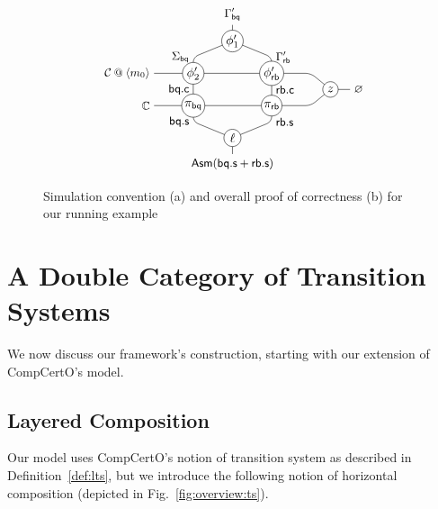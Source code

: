 \documentclass[acmsmall,screen,review,anonymous]{acmart}
\newcommand{\kw}[1]{\ensuremath{ \mathsf{#1} }}
\begin{document}
\begin{figure}
\[{{\begin{tikzpicture}[yscale=0.45,xscale=1.1]
    \begin{scope}
      \small
      \draw (0,5) node[above] {$\Gamma_\kw{bq}'$} -- (0,4)
        [rounded corners] -- (-1,3) node[left] {$\Sigma_\kw{bq}$}
        [rounded corners] -- (-1,-1) node[left,pos=0.5] {$\kw{bq.c}$}
          node[left,pos=1] {$\kw{bq.s}$}
        [sharp corners] -- (0,-2)
          -- (0,-3) node[below] {$\kw{Asm}(\kw{bq.s+rb.s})$};
      \draw (0,4)
        [rounded corners] -- (1,3) node[right] {$\Gamma_\kw{rb}'$}
        [rounded corners] -- (1,-1) node[right,pos=0.5] {$\kw{rb.c}$}
          node[right,pos=1] {$\kw{rb.s}$}
        [sharp corners] -- (0,-2);
      \draw (-2,2) node[left] {$\mathcal{C} \mathbin@ \langle m_0 \rangle$}
        [rounded corners] -- (2,2)
        [sharp corners] -- (2.5,1) -- (3,1) node[right] {$\varnothing$};
      \draw (2.5,1)
        [rounded corners] -- (2,0)
        [sharp corners] -- (-2,0) node[left] {$\mathbb{C}$};
    \end{scope}

    \begin{scope}[every node/.style={circle,draw,fill=white,inner sep=1pt}]
      \node at (0,4) {$\phi_1'$};
      \node at (-1,2) {$\phi_2'$};
      \node at (+1,2) {$\phi_\kw{rb}'$};
      \node at (-1,0) {$\pi_\kw{bq}$};
      \node at (+1,0) {$\pi_\kw{rb}$};
      \node[inner sep=2pt] at (0,-2) {$\ell$};
      \node[inner sep=2pt] (z) at (2.5,1) {$z$};
    \end{scope}
  \end{tikzpicture}
  }}
\]
  \caption{Simulation convention (a) and
    overall proof of correctness (b) for our running example}
  \label{fig:overall}
\end{figure}


\section{A Double Category of Transition Systems} \label{sec:base} %

We now discuss our framework's construction,
starting with our extension of CompCertO's model.

\subsection{Layered Composition} \label{sec:base:ts} %

Our model uses CompCertO's notion of transition system
as described in Definition~\ref{def:lts},
but we introduce the following notion of horizontal composition
(depicted in Fig.~\ref{fig:overview:ts}).
\end{document}
